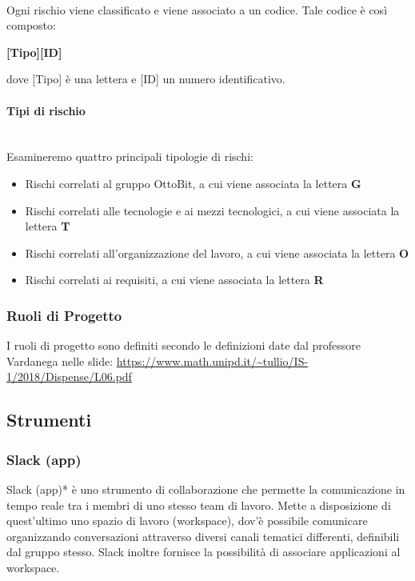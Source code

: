 \documentclass[11pt,a4paper]{article}
\begin{document}
\noindent \\
 Ogni rischio viene classificato e viene associato a un codice. Tale codice è così composto:
\begin{center}
	\textbf{[Tipo][ID]}
\end{center}
dove [Tipo] è una lettera e [ID] un numero identificativo.\\

\paragraph{Tipi di rischio} 
\noindent \\
 Esamineremo quattro principali tipologie di rischi:

\begin{itemize}
	\item Rischi correlati al gruppo OttoBit, a cui viene associata la lettera \textbf{G}
	\item Rischi correlati alle tecnologie e ai mezzi tecnologici, a cui viene associata la lettera \textbf{T}
	\item Rischi correlati all'organizzazione del lavoro, a cui viene associata la lettera \textbf{O}
	\item Rischi correlati ai requisiti, a cui viene associata la lettera \textbf{R}
\end{itemize}

\subsubsection{Ruoli di Progetto}
I ruoli di progetto sono definiti secondo le definizioni date dal professore Vardanega nelle slide:
\url{https://www.math.unipd.it/~tullio/IS-1/2018/Dispense/L06.pdf}

\newpage

\subsection{Strumenti}

\subsubsection{Slack (app)}
Slack (app)* è uno strumento di collaborazione che permette la comunicazione in tempo reale tra i membri di uno stesso team di lavoro. Mette a disposizione di quest’ultimo uno spazio di lavoro (workspace), dov'è possibile comunicare organizzando conversazioni attraverso diversi canali tematici differenti, definibili dal gruppo stesso.
Slack inoltre fornisce la possibilità di associare applicazioni al workspace.
\end{document}

